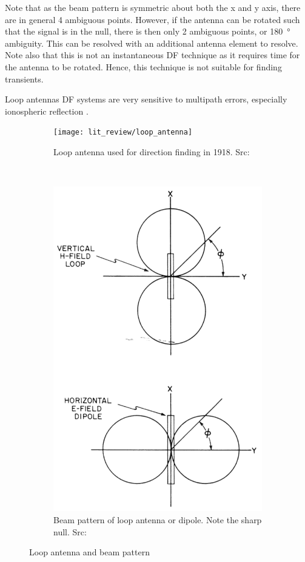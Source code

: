 Note that as the beam pattern is symmetric about both the x and y axis, there are in general 4 ambiguous points. However, if the antenna can be rotated such that the signal is in the null, there is then only 2 ambiguous points, or \SI{180}{\degree} ambiguity. This can be resolved with an  additional antenna element to resolve. Note also that this is not an instantaneous DF technique as it requires time for the antenna to be rotated. Hence, this technique is not suitable for finding transients. 

Loop antennas DF systems are very sensitive to multipath errors, especially ionospheric reflection \cite{jenkins1991smallaperture}. 
\begin{figure}
  \centering
  \begin{subfigure}[b]{0.4\textwidth}
    \texttt{[image: lit\_review/loop\_antenna]}
    \caption{Loop antenna used for direction finding in 1918. Src: \cite{grabau1989funkpeiltechnik}}
  \end{subfigure}
  ~
  \begin{subfigure}[b]{0.35\textwidth}
   \includegraphics[width=\textwidth]{./img/lit_review/loop_antenna_beam}
   \caption{Beam pattern of loop antenna or dipole. Note the sharp null. Src: \cite{jenkins1991smallaperture}}
  \end{subfigure}
  \caption{Loop antenna and beam pattern}
  \label{fig:lit_loop_antenna}
\end{figure}


